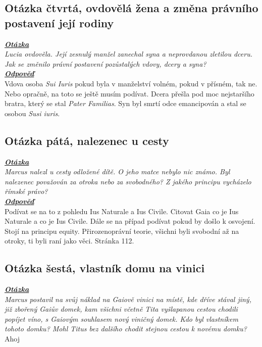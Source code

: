 \documentclass{article}
\begin{document}


\subsection{Otázka čtvrtá, ovdovělá žena a změna právního postavení její rodiny}
\textbf{\textit{\underline{Otázka}}}\\

\textit{Lucia ovdověla. Její zesnulý manžel zanechal syna a neprovdanou zletilou dceru. Jak se změnilo právní postavení pozůstalých vdovy, dcery a syna?}\\

\noindent\textbf{\textit{\underline{Odpověď}}}\\

Vdova osoba \textit{Sui Iuris} pokud byla v manželství volném, pokud v přísném, tak ne. Nebo opračně, na toto se ještě musím podívat. Dcera přešla pod moc nejstaršího bratra, který se stal \textit{Pater Familias}. Syn byl smrtí odce emancipován a stal se osobou \textit{Susi iuris}.

\subsection{Otázka pátá, nalezenec u cesty}
\textbf{\textit{\underline{Otázka}}}\\
\textit{Marcus nalezl u cesty odložené dítě. O jeho matce nebylo nic známo. Byl nalezenec považován za otroka nebo za svobodného? Z jakého principu vycházelo římské právo?}\\

\noindent\noindent\textbf{\textit{\underline{Odpověď}}}\\

Podívat se na to z pohledu Ius Naturale a Ius Civile.
Citovat Gaia co je Ius Naturale a co je Ius Civile.
Dále se na případ podívat pokud by došlo k osvojení.
Stojí na principu equity.
Přirozenoprávní teorie, všichni byli svobodní až na otroky, ti byli raní jako věci.
Stránka 112.

\subsection{Otázka šestá, vlastník domu na vinici}
\textbf{\textit{\underline{Otázka}}}\\
\textit{Marcus postavil na svůj náklad na Gaiově vinici na místě, kde dříve stával jiný, již zbořený Gaiův domek, kam všichni včetně Tita vyšlapanou cestou chodili popíjet víno, s Gaiovým souhlasem nový viničný domek. Kdo byl vlastníkem tohoto domku? Mohl Titus bez dalšího chodit stejnou cestou k novému domku?}\\
Ahoj
\end{document}
